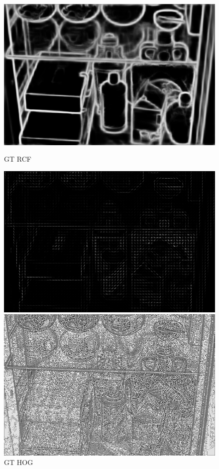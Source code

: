 \documentclass[CJK,aspectratio=169]{beamer}  %
\begin{document}
\begin{frame}
\begin{figure}
\begin{minipage}{.19\textwidth}
				\includegraphics[width=\linewidth]{picture/LLIE/My Architecture/Edge Detection/normal00044_rcf}
				\caption*{\tiny GT RCF}
				\label{fig: GT_rcf}	
			\end{minipage}
			\begin{minipage}{.19\textwidth}
				\centering
				\includegraphics[width=\linewidth]{picture/LLIE/My Architecture/Edge Detection/normal00044_hog}
				\caption*{\tiny GT HOG}
				\label{fig: GT_hog}	
			\end{minipage}
			\begin{minipage}{.19\textwidth}
				\centering
				\includegraphics[width=\linewidth]{picture/LLIE/My Architecture/Edge Detection/normal00044_lbp}

\end{minipage}
\end{figure}
\end{frame}
\end{document}
